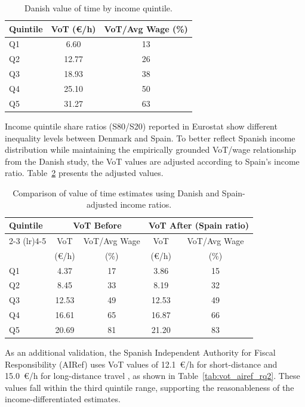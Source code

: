 \begin{table}[H]
    \centering
    \caption{Danish value of time by income quintile.}
    \label{tab:danish_vot_rq2}
    \begin{tabular}{lcc}
    \toprule
    Quintile & VoT (\euro/h) & VoT/Avg Wage (\%) \\
    \midrule
    Q1 & 6.60 & 13 \\
    Q2 & 12.77 & 26 \\
    Q3 & 18.93 & 38 \\
    Q4 & 25.10 & 50 \\
    Q5 & 31.27 & 63 \\
    \bottomrule
    \end{tabular}
\end{table}

Income quintile share ratios (S80/S20) reported in Eurostat \citep{eurostat_ilc_di11} show different inequality levels between Denmark and Spain. To better reflect Spanish income distribution while maintaining the empirically grounded VoT/wage relationship from the Danish study, the VoT values are adjusted according to Spain's income ratio. Table~\ref{tab:vot_rq2} presents the adjusted values.

\begin{table}[H]
    \centering
    \caption{Comparison of value of time estimates using Danish and Spain-adjusted income ratios.}
    \label{tab:vot_rq2}
    \begin{tabular}{lcccc}
    \toprule
    Quintile & \multicolumn{2}{c}{VoT Before} & \multicolumn{2}{c}{VoT After (Spain ratio)} \\
    \cmidrule(lr){2-3} \cmidrule(lr){4-5}
             & VoT & VoT/Avg Wage & VoT & VoT/Avg Wage \\
             & (\euro/h) & (\%) & (\euro/h) & (\%) \\
    \midrule
    Q1 & 4.37 & 17 & 3.86 & 15 \\
    Q2 & 8.45 & 33 & 8.19 & 32 \\
    Q3 & 12.53 & 49 & 12.53 & 49 \\
    Q4 & 16.61 & 65 & 16.87 & 66 \\
    Q5 & 20.69 & 81 & 21.20 & 83 \\
    \bottomrule
    \end{tabular}
\end{table}

As an additional validation, the Spanish Independent Authority for Fiscal Responsibility (AIRef) uses VoT values of 12.1~\euro/h for short-distance and 15.0~\euro/h for long-distance travel \citep{deRus2020}, as shown in Table~\ref{tab:vot_airef_rq2}. These values fall within the third quintile range, supporting the reasonableness of the income-differentiated estimates.

